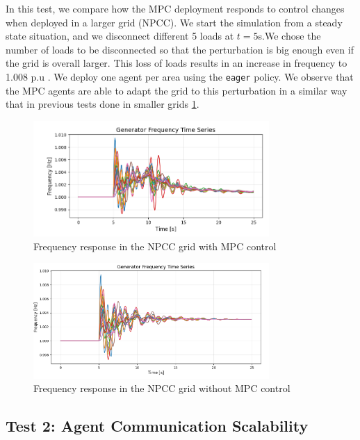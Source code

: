 \documentclass{article}
\begin{document}
In this test, we compare how the MPC deployment responds to control changes when deployed in a larger grid (NPCC). We start the simulation from a steady state situation, and we disconnect different 5 loads at $t=5$s.We chose the number of loads to be disconnected so that the perturbation is big enough even if the grid is overall larger. This loss of loads results in an increase in frequency to 1.008 p.u . We deploy one agent per area using the \texttt{eager} policy. We observe that the MPC agents are able to adapt the grid to this perturbation in a similar way that in previous tests done in smaller grids \ref{fig:test1}. 

\begin{figure}[ht]
\centering
\includegraphics[width=0.8\textwidth]{figures/freq_npcc.png} %
\caption{Frequency response in the NPCC grid with MPC control}
\label{fig:test1}
\end{figure}

\begin{figure}[ht]
\centering
\includegraphics[width=0.8\textwidth]{figures/mpcless_npcc.png} %
\caption{Frequency response in the NPCC grid without MPC control}
\label{fig:test1less}
\end{figure}


\subsection*{Test 2: Agent Communication Scalability}
\end{document}
